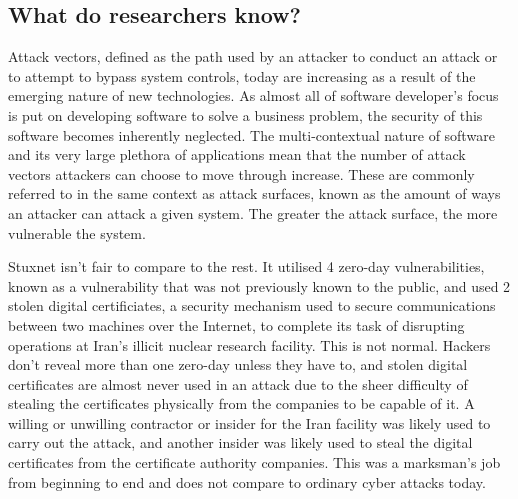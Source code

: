 \documentclass[a4paper, 11pt]{article}
\begin{document}
\subsection{What do researchers know?}
Attack vectors, defined as the path used by an attacker to conduct an attack or to attempt to bypass system controls, \cite{ref:biometricattackvectors} today are increasing as a result of the emerging nature of new technologies. As almost all of software developer's focus is put on developing software to solve a business problem, the security of this software becomes inherently neglected. The multi-contextual nature of software and its very large plethora of applications mean that the number of attack vectors attackers can choose to move through increase. These are commonly referred to in the same context as attack surfaces, known as the amount of ways an attacker can attack a given system. The greater the attack surface, the more vulnerable the system.

Stuxnet isn't fair to compare to the rest. It utilised 4 zero-day vulnerabilities, known as a vulnerability that was not previously known to the public, and used 2 stolen digital certificiates, a security mechanism used to secure communications between two machines over the Internet, \cite{ref:stuxnet2011report} to complete its task of disrupting operations at Iran's illicit nuclear research facility. \cite{ref:singer2014cybersecurity} This is not normal. Hackers don't reveal more than one zero-day unless they have to, and stolen digital certificates are almost never used in an attack due to the sheer difficulty of stealing the certificates physically from the companies to be capable of it. \cite{ref:singer2014cybersecurity} A willing or unwilling contractor or insider for the Iran facility was likely used to carry out the attack, and another insider was likely used to steal the digital certificates from the certificate authority companies. \cite{ref:stuxnet2011report} This was a marksman's job from beginning to end and does not compare to ordinary cyber 
attacks today. \cite{ref:stuxnet2011report}
\end{document}
